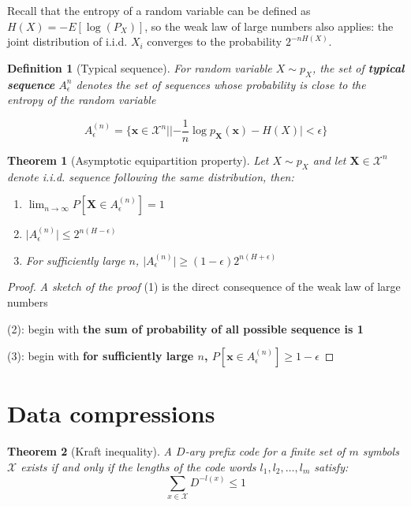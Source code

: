 \documentclass{article}
\newcommand{\norm}[1]{\vert {#1} \vert}
\newtheorem{definition}{Definition}[section]
\newtheorem{theorem}{Theorem}[section]
\begin{document}
    Recall that the entropy of a random variable can be defined as $H(X) = -E[\log(P_X)]$, so the weak law of large numbers also applies: the joint distribution of i.i.d. $X_i$ converges to the probability $2^{-nH(X)}$.

    \begin{definition}[Typical sequence]
        For random variable $X \sim p_X$, the set of \textbf{typical sequence} $A_\epsilon^n$ denotes the set of sequences whose probability is close to the entropy of the random variable

        \begin{equation*}
            A_\epsilon^{(n)} = \{
                \mathbf{x} \in \mathcal{X}^n 
                \mid \norm{
                    -\frac{1}{n}\log p_{\mathbf{X}}(\mathbf{x})
                    - H(X)
                } < \epsilon
            \}
        \end{equation*}
    \end{definition}

    \begin{theorem}[Asymptotic equipartition property]
        Let $X \sim p_X$ and let $\mathbf{X} \in \mathcal{X}^n$ denote i.i.d. sequence following the same distribution, then:

        \begin{enumerate}
            \item $\lim_{n \rightarrow \infty}P[\mathbf{X} \in A_\epsilon^{(n)}] = 1$
            \item $\norm{A_\epsilon^{(n)}} \leq 2^{n(H - \epsilon)}$
            \item For sufficiently large $n$, $\norm{A_\epsilon^{(n)}} \geq (1-\epsilon)2^{n(H+\epsilon)}$
        \end{enumerate}
    \end{theorem}

    \begin{proof}
        \textit{A sketch of the proof}
        (1) is the direct consequence of the weak law of large numbers

        (2): begin with \textbf{the sum of probability of all possible sequence is 1}

        (3): begin with \textbf{for sufficiently large $n$, $P[\mathbf{x} \in A_\epsilon^{(n)}] \geq 1 - \epsilon$}
    \end{proof}

\section{Data compressions}
    \begin{theorem}[Kraft inequality]
    A $D$-ary prefix code for a finite set of $m$ symbols $\mathcal{X}$ exists if and only if the lengths of the code words $l_1, l_2, \ldots, l_m$ satisfy:
    \begin{equation*}
        \sum_{x \in \mathcal{X}} D^{-l(x)} \leq 1
    \end{equation*}
    \end{theorem}
\end{document}
